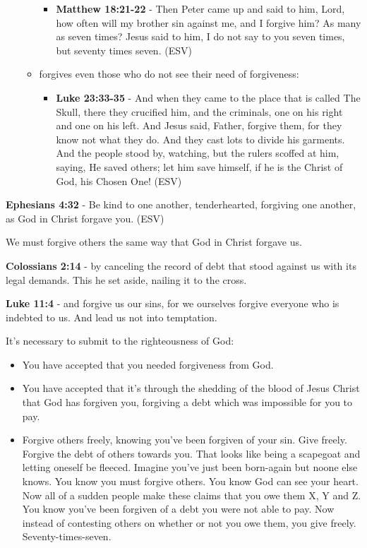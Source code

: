 \documentclass[11pt]{article}
\begin{document}
\begin{itemize}
\begin{itemize}
\begin{itemize}
\item \textbf{Matthew 18:21-22} -  Then Peter came up and said to him, Lord, how often will my brother sin against me, and I forgive him?  As many as seven times?  Jesus said to him, I do not say to you seven times, but seventy times seven. (ESV)
\end{itemize}
\item forgives even those who do not see their need of forgiveness:
\begin{itemize}
\item \textbf{Luke 23:33-35} - And when they came to the place that is called The Skull, there they crucified him, and the criminals, one on his right and one on his left.  And Jesus said, Father, forgive them, for they know not what they do. And they cast lots to divide his garments.  And the people stood by, watching, but the rulers scoffed at him, saying, He saved others; let him save himself, if he is the Christ of God, his Chosen One! (ESV)
\end{itemize}
\end{itemize}
\end{itemize}

\textbf{Ephesians 4:32} - Be kind to one another, tenderhearted, forgiving one another, as God in Christ forgave you. (ESV)

We must forgive others the same way that God in Christ forgave us.

\textbf{Colossians 2:14} - by canceling the record of debt that stood against us with its legal demands. This he set aside, nailing it to the cross.

\textbf{Luke 11:4} - and forgive us our sins, for we ourselves forgive everyone who is indebted to us. And lead us not into temptation.

It's necessary to submit to the righteousness of God:
\begin{itemize}
\item You have accepted that you needed forgiveness from God.
\item You have accepted that it's through the shedding of the blood of Jesus Christ that God has forgiven you, forgiving a debt which was impossible for you to pay.
\item Forgive others freely, knowing you've been forgiven of your sin. Give freely. Forgive the debt of others towards you. That looks like being a scapegoat and letting oneself be fleeced. Imagine you've just been born-again but noone else knows. You know you must forgive others. You know God can see your heart. Now all of a sudden people make these claims that you owe them X, Y and Z. You know you've been forgiven of a debt you were not able to pay. Now instead of contesting others on whether or not you owe them, you give freely. Seventy-times-seven.
\end{itemize}
\end{document}
